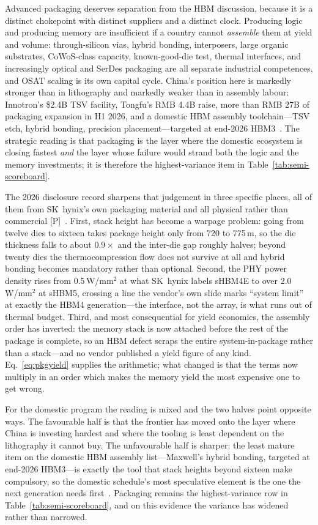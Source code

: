 Advanced packaging deserves separation from the HBM discussion, because it is a distinct chokepoint with distinct suppliers and a distinct clock. Producing logic and producing memory are insufficient if a country cannot \emph{assemble} them at yield and volume: through-silicon vias, hybrid bonding, interposers, large organic substrates, CoWoS-class capacity, known-good-die test, thermal interfaces, and increasingly optical and SerDes packaging are all separate industrial competences, and OSAT scaling is its own capital cycle. China's position here is markedly stronger than in lithography and markedly weaker than in assembly labour: Innotron's \$2.4B TSV facility, Tongfu's RMB 4.4B raise, more than RMB 27B of packaging expansion in H1 2026, and a domestic HBM assembly toolchain---TSV etch, hybrid bonding, precision placement---targeted at end-2026 HBM3~\cite{packaging,hbm-toolchain}. The strategic reading is that packaging is the layer where the domestic ecosystem is closing fastest \emph{and} the layer whose failure would strand both the logic and the memory investments; it is therefore the highest-variance item in Table~\ref{tab:semi-scoreboard}.

The 2026 disclosure record sharpens that judgement in three specific places, all of them from SK~hynix's own packaging material and all physical rather than commercial [P]~\cite{hc2026,hc2026-hbm4-spread}. First, stack height has become a warpage problem: going from twelve dies to sixteen takes package height only from 720 to 775\,\textmu m, so the die thickness falls to about $0.9\times$ and the inter-die gap roughly halves; beyond twenty dies the thermocompression flow does not survive at all and hybrid bonding becomes mandatory rather than optional. Second, the PHY power density rises from 0.5\,W/mm$^2$ at what SK~hynix labels sHBM4E to over 2.0\,W/mm$^2$ at sHBM5, crossing a line the vendor's own slide marks ``system limit'' at exactly the HBM4 generation---the interface, not the array, is what runs out of thermal budget. Third, and most consequential for yield economics, the assembly order has inverted: the memory stack is now attached before the rest of the package is complete, so an HBM defect scraps the entire system-in-package rather than a stack---and no vendor published a yield figure of any kind. Eq.~\eqref{eq:pkgyield} supplies the arithmetic; what changed is that the terms now multiply in an order which makes the memory yield the most expensive one to get wrong.

For the domestic program the reading is mixed and the two halves point opposite ways. The favourable half is that the frontier has moved onto the layer where China is investing hardest and where the tooling is least dependent on the lithography it cannot buy. The unfavourable half is sharper: the least mature item on the domestic HBM assembly list---Maxwell's hybrid bonding, targeted at end-2026 HBM3---is exactly the tool that stack heights beyond sixteen make compulsory, so the domestic schedule's most speculative element is the one the next generation needs first~\cite{hbm-toolchain}. Packaging remains the highest-variance row in Table~\ref{tab:semi-scoreboard}, and on this evidence the variance has widened rather than narrowed.

